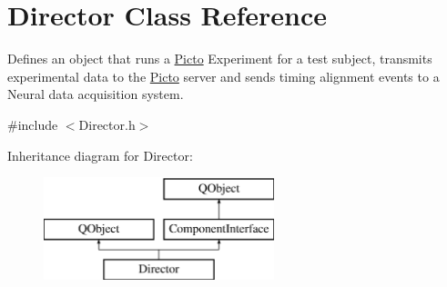\hypertarget{class_director}{\section{Director Class Reference}
\label{class_director}
}


Defines an object that runs a \hyperlink{namespace_picto}{Picto} Experiment for a test subject, transmits experimental data to the \hyperlink{namespace_picto}{Picto} server and sends timing alignment events to a Neural data acquisition system.  




{\ttfamily \#include $<$Director.\-h$>$}

Inheritance diagram for Director\-:\begin{figure}[H]
\begin{center}
\leavevmode
\includegraphics[height=3.000000cm]{class_director}
\end{center}
\end{figure}
